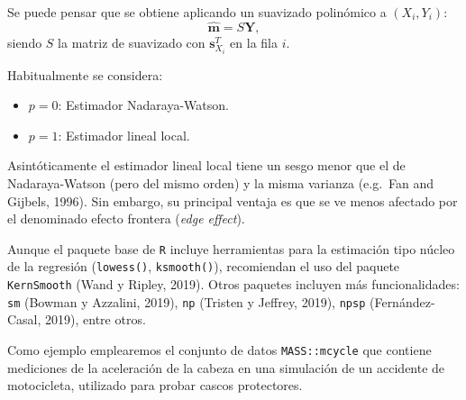 \documentclass[
]{book}
\newenvironment{Shaded}{\begin{snugshade}}{\end{snugshade}}
\newcommand{\CommentTok}[1]{\textcolor[rgb]{0.56,0.35,0.01}{\textit{#1}}}
\newcommand{\DataTypeTok}[1]{\textcolor[rgb]{0.13,0.29,0.53}{#1}}
\newcommand{\KeywordTok}[1]{\textcolor[rgb]{0.13,0.29,0.53}{\textbf{#1}}}
\newcommand{\NormalTok}[1]{#1}
\newcommand{\OperatorTok}[1]{\textcolor[rgb]{0.81,0.36,0.00}{\textbf{#1}}}
\newcommand{\StringTok}[1]{\textcolor[rgb]{0.31,0.60,0.02}{#1}}
\theoremstyle{break}
\theoremstyle{definition}
\theoremstyle{definition}
\theoremstyle{definition}
\theoremstyle{remark}
\begin{document}
Se puede pensar que se obtiene aplicando un suavizado polinómico a
\((X_i, Y_i)\):
\[\hat{\boldsymbol{m}} = S\mathbf{Y},\]
siendo \(S\) la matriz de suavizado con \(\mathbf{s}_{X_{i}}^{T}\) en la fila \(i\).

Habitualmente se considera:

\begin{itemize}
\item
  \(p=0\): Estimador Nadaraya-Watson.
\item
  \(p=1\): Estimador lineal local.
\end{itemize}

Asintóticamente el estimador lineal local tiene un sesgo menor que el de
Nadaraya-Watson (pero del mismo orden) y la misma varianza (e.g.~Fan and Gijbels, 1996).
Sin embargo, su principal ventaja es que se ve menos afectado por el denominado
efecto frontera (\emph{edge effect}).

Aunque el paquete base de \texttt{R} incluye herramientas para la estimación
tipo núcleo de la regresión (\texttt{lowess()}, \texttt{ksmooth()}), recomiendan
el uso del paquete \texttt{KernSmooth} (Wand y Ripley, 2019).
Otros paquetes incluyen más funcionalidades: \texttt{sm} (Bowman y Azzalini, 2019),
\texttt{np} (Tristen y Jeffrey, 2019), \texttt{npsp} (Fernández-Casal, 2019), entre otros.

Como ejemplo emplearemos el conjunto de datos \texttt{MASS::mcycle} que contiene mediciones
de la aceleración de la cabeza en una simulación de un accidente de motocicleta,
utilizado para probar cascos protectores.

\begin{Shaded}
\end{Shaded}
\end{document}
